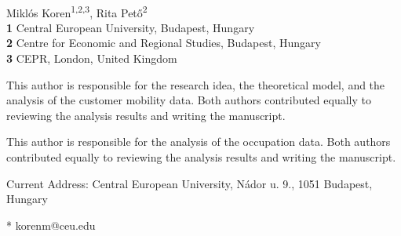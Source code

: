\documentclass[10pt,letterpaper]{article}
\begin{document}
\vspace*{0.2in}

\begin{flushleft}
{\Large
\textbf{} %
}
\newline
\\
Miklós Koren\textsuperscript{1,2,3\Yinyang\textcurrency*},
Rita Pető\textsuperscript{2\ddag}
\\
\bigskip
\textbf{1} Central European University, Budapest, Hungary
\\
\textbf{2} Centre for Economic and Regional Studies, Budapest, Hungary
\\
\textbf{3} CEPR, London, United Kingdom
\\
\bigskip

% 
%
\Yinyang This author is responsible for the research idea, the theoretical model, and the analysis of the customer mobility data. Both authors contributed equally to reviewing the analysis results and writing the manuscript. 

\ddag This author is responsible for the analysis of the occupation data. Both authors contributed equally to reviewing the analysis results and writing the manuscript.

\textcurrency Current Address: Central European University, Nádor u. 9., 1051 Budapest, Hungary %

* korenm@ceu.edu

\end{flushleft}
\end{document}
